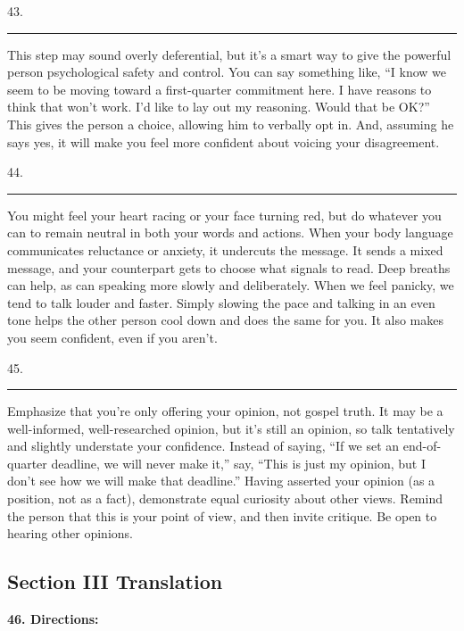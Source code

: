 \documentclass[UTF8,11pt]{ctexart}
\begin{document}
43. \par\noindent\rule{.95\linewidth}{.4pt}\par


This step may sound overly deferential, but it’s a smart way to give the powerful person psychological safety and control. You can say something like, “I know we seem to be moving toward a first-quarter commitment here. I have reasons to think that won’t work. I’d like to lay out my reasoning. Would that be OK?” This gives the person a choice, allowing him to verbally opt in. And, assuming he says yes, it will make you feel more confident about voicing your disagreement.


44. \par\noindent\rule{.95\linewidth}{.4pt}\par


You might feel your heart racing or your face turning red, but do whatever you can to remain neutral in both your words and actions. When your body language communicates reluctance or anxiety, it undercuts the message. It sends a mixed message, and your counterpart gets to choose what signals to read. Deep breaths can help, as can speaking more slowly and deliberately. When we feel panicky, we tend to talk louder and faster. Simply slowing the pace and talking in an even tone helps the other person cool down and does the same for you. It also makes you seem confident, even if you aren’t.


45. \par\noindent\rule{.95\linewidth}{.4pt}\par


Emphasize that you’re only offering your opinion, not gospel truth. It may be a well-informed, well-researched opinion, but it’s still an opinion, so talk tentatively and slightly understate your confidence. Instead of saying, “If we set an end-of-quarter deadline, we will never make it,” say, “This is just my opinion, but I don’t see how we will make that deadline.” Having asserted your opinion (as a position, not as a fact), demonstrate equal curiosity about other views. Remind the person that this is your point of view, and then invite critique. Be open to hearing other opinions.


\subsection*{\textbf{Section III Translation}}


\textbf{46. Directions:}
\end{document}
